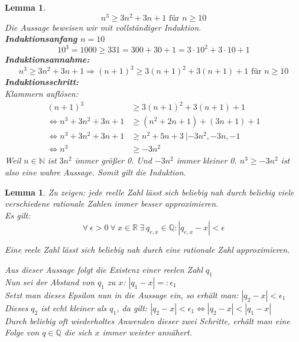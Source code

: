 \documentclass{article}
\begin{document}
    \newtheorem{lemma3}[lemma_counter]{Lemma}
    \begin{lemma3}
        \[n^3 \geq 3n^2 + 3n + 1 \text{ für } n \geq 10 \]
        Die Aussage beweisen wir mit vollständiger Induktion. \\
        \textbf{Induktionsanfang \(n=10\)}
        \[10^3 = 1000 \geq 331 = 300 + 30 + 1 = 3 \cdot 10^2 + 3 \cdot 10 + 1\]
        \textbf{Induktionsannahme:}
        \[ n^3 \geq 3n^2 + 3n + 1 \Rightarrow {(n+1)}^3 \geq 3{(n+1)}^2 + 3(n+1) + 1 \text{ für } n \geq 10 \]
        \textbf{Induktionsschritt:} \\
        Klammern auflösen:
        \begin{align*}
            {(n+1)}^3 & \geq 3{(n+1)}^2 + 3(n+1) + 1 \\
            \Leftrightarrow n^3 + 3n^2 + 3n + 1 & \geq (n^2 + 2n + 1) + (3n + 1) + 1 \\
            \Leftrightarrow n^3 + 3n^2 + 3n + 1 & \geq n^2 + 5n + 3 \: | -3n^2, -3n, -1 \\
            \Leftrightarrow n^3 & \geq -3n^2
        \end{align*}
        Weil \(n \in \mathbb{N}\) ist \(3n^2\) immer größer 0. Und \(-3n^2\) immer kleiner 0.
        \(n^3 \geq -3n^2\) ist also eine wahre Aussage. Somit gilt die Induktion.
    \end{lemma3}

    \newtheorem{lemma4}[lemma_counter]{Lemma}
    \begin{lemma4}
        Zu zeigen: jede reelle Zahl lässt sich beliebig nah durch beliebig viele verschiedene rationale Zahlen immer besser approximieren. \\
        Es gilt: 
        \[\forall \: \epsilon > 0 \: \forall \: x \in \mathbb{R} \: \exists \: q_{e,x} \in \mathbb{Q}: |q_{e,x} - x| < \epsilon \]
        \begin{center}
            Eine reele Zahl lässt sich beliebig nah durch eine rationale Zahl approximieren.
        \end{center}
        Aus dieser Aussage folgt die Existenz einer reelen Zahl \(q_1\) \\
        Nun sei der Abstand von \(q_1\) zu \(x\): \( |q_1 - x| =: \epsilon_1 \) \\
        Setzt man dieses Epsilon nun in die Aussage ein, so erhält man: \( |q_2 - x| < \epsilon_1 \) \\
        Dieses \(q_2\) ist echt kleiner als \(q_1\), da gilt:
        \( |q_2 - x| < \epsilon_1 \Leftrightarrow |q_2 - x| < |q_1 - x| \) \\
        Durch beliebig oft wiederholtes Anwenden dieser zwei Schritte, erhält man eine Folge von \(q \in \mathbb{Q} \) die sich \(x\) immer weieter annähert. 
    \end{lemma4}
\end{document}
